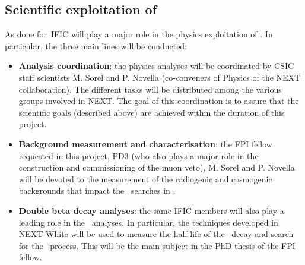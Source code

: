 

\subsection*{Scientific exploitation of \Next}

As done for\NEW\, IFIC will play a major role in the physics exploitation of \Next. In particular, the three main lines will be conducted: 

\begin{itemize}[noitemsep,topsep=0pt,parsep=0pt,partopsep=0pt]
    \item {\bf Analysis coordination}: the physics analyses will be coordinated by CSIC staff scientists M. Sorel and P. Novella (co-conveners of Physics of the NEXT collaboration). The different tasks will be distributed among the various groups involved in NEXT. The goal of this coordination is to assure that the scientific goals (described above) are achieved within the duration of this project. 
    \item {\bf Background measurement and characterisation}: the FPI fellow requested in this project, PD3 (who also plays a major role in the construction and commissioning of the muon veto), M. Sorel and P. Novella will be devoted to the measurement of the radiogenic and cosmogenic backgrounds that impact the \bb\ searches in \Next. 
    \item {\bf Double beta decay analyses}: the same IFIC members will also play a leading role in the \bb\ analyses. In particular, the techniques developed in NEXT-White will be used to measure the half-life of the \bbtnu\ decay and search for the \bbonu\ process. This will be the main subject in the PhD thesis of the FPI fellow.
\end{itemize}


